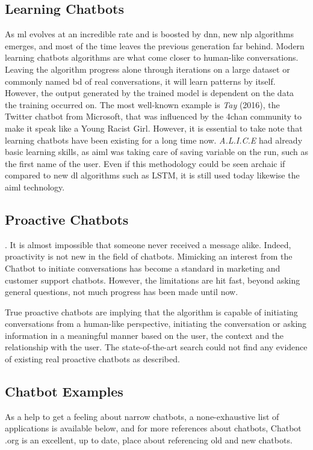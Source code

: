 \subsection{Learning Chatbots} 
As \gls{ml} evolves at an incredible rate and is boosted by \gls{dnn}, new \gls{nlp} algorithms emerges, and most of the time leaves the previous generation far behind. Modern learning chatbots algorithms are what come closer to human-like conversations. Leaving the algorithm progress alone through iterations on a large dataset or commonly named \gls{bd} of real conversations, it will learn patterns by itself. However, the output generated by the trained model is dependent on the data the training occurred on. The most well-known example is \textit{Tay}\cite{chatbot:tay} (2016), the Twitter chatbot from Microsoft, that was influenced by the 4chan community to make it speak like a Young Racist Girl.
However, it is essential to take note that learning chatbots have been existing for a long time now. \textit{A.L.I.C.E}\cite{chatbot:alice} had already basic learning skills, as \gls{aiml} was taking care of saving variable on the run, such as the first name of the user. Even if this methodology could be seen archaic if compared to new \gls{dl} algorithms such as LSTM, it is still used today likewise the \gls{aiml} technology.


\subsection{Proactive Chatbots}
. It is almost impossible that someone never received a message alike. Indeed, proactivity is not new in the field of chatbots. Mimicking an interest from the Chatbot to initiate conversations has become a standard in marketing and customer support chatbots. However, the limitations are hit fast, beyond asking general questions, not much progress has been made until now.

True proactive chatbots are implying that the algorithm is capable of initiating conversations from a human-like perspective, initiating the conversation or asking information in a meaningful manner based on the user, the context and the relationship with the user. The state-of-the-art search could not find any evidence of existing real proactive chatbots as described.


\subsection{Chatbot Examples}
As a help to get a feeling about narrow chatbots, a none-exhaustive list of applications is available below, and for more references about chatbots, Chatbot .org\cite{chatbot:chatbots-org} is an excellent, up to date, place about referencing old and new chatbots.


